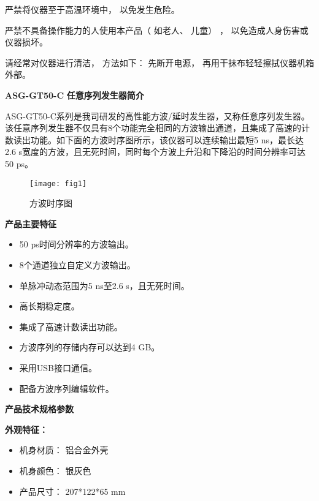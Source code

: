 严禁将仪器至于高温环境中， 以免发生危险。

\vspace{0.5cm}

严禁不具备操作能力的人使用本产品（ 如老人、 儿童） ， 以免造成人身伤害或仪器损坏。

\vspace{0.5cm}

请经常对仪器进行清洁， 方法如下： 先断开电源， 再用干抹布轻轻擦拭仪器机箱外部。

\newpage
\noindent\huge \textbf{ASG-GT50-C} \xiaoer\textbf{任意序列发生器简介}
\vspace{0.6cm}

\normalsize ASG-GT50-C\song 系列是我司研发的高性能方波/延时发生器，又称任意序列发生器。该任意序列发生器不仅具有8个功能完全相同的方波输出通道，且集成了高速的计数读出功能。如下面的方波时序图所示，该仪器可以连续输出最短5 ns，最长达2.6 s宽度的方波，且无死时间，同时每个方波上升沿和下降沿的时间分辨率可达50 ps。
\begin{figure}[ht]
\centering
\texttt{[image: fig1]}
\caption{方波时序图}\label{fig:fig1}
\end{figure}
\vspace{0.9cm}

\noindent\sanhao\textbf{产品主要特征}
\vspace{0.6cm}
\song
\begin{itemize}
 \item 50 ps时间分辨率的方波输出。
 \item 8个通道独立自定义方波输出。
 \item 单脉冲动态范围为5 ns至2.6 s，且无死时间。
 \item 高长期稳定度。
 \item 集成了高速计数读出功能。
 \item 方波序列的存储内存可以达到4 GB。
 \item 采用USB接口通信。
 \item 配备方波序列编辑软件。
\end{itemize}

\vspace{0.6cm}
\noindent\sanhao\textbf{产品技术规格参数}
\vspace{0.6cm}

\noindent\xiaosi\textbf{外观特征：}
\vspace{0.4cm}
\song
\begin{itemize}
 \item 机身材质： 铝合金外壳
 \item 机身颜色： 银灰色
 \item 产品尺寸： 207*122*65 mm
\end{itemize}

